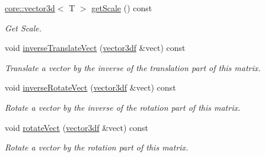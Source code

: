\begin{DoxyCompactItemize}
\mbox{\label{classirr_1_1core_1_1CMatrix4_a67d337a8fe0fe31dbd8e277be63582f6}} 
\hyperlink{classirr_1_1core_1_1vector3d}{core\+::vector3d}$<$ T $>$ \hyperlink{classirr_1_1core_1_1CMatrix4_a67d337a8fe0fe31dbd8e277be63582f6}{get\+Scale} () const
\begin{DoxyCompactList}\small\item\em Get Scale. \end{DoxyCompactList}\item 
\mbox{\label{classirr_1_1core_1_1CMatrix4_a7850ba9e85bff2b7d8e3bce517e0aba0}} 
void \hyperlink{classirr_1_1core_1_1CMatrix4_a7850ba9e85bff2b7d8e3bce517e0aba0}{inverse\+Translate\+Vect} (\hyperlink{namespaceirr_1_1core_ae6e2b2a6c552833ebbd5b7463d03586b}{vector3df} \&vect) const
\begin{DoxyCompactList}\small\item\em Translate a vector by the inverse of the translation part of this matrix. \end{DoxyCompactList}\item 
\mbox{\label{classirr_1_1core_1_1CMatrix4_aed5bc8bb8e9b58549034e2f48189d35e}} 
void \hyperlink{classirr_1_1core_1_1CMatrix4_aed5bc8bb8e9b58549034e2f48189d35e}{inverse\+Rotate\+Vect} (\hyperlink{namespaceirr_1_1core_ae6e2b2a6c552833ebbd5b7463d03586b}{vector3df} \&vect) const
\begin{DoxyCompactList}\small\item\em Rotate a vector by the inverse of the rotation part of this matrix. \end{DoxyCompactList}\item 
\mbox{\label{classirr_1_1core_1_1CMatrix4_a45e023efd5e6d0e328c63705bfb5bd06}} 
void \hyperlink{classirr_1_1core_1_1CMatrix4_a45e023efd5e6d0e328c63705bfb5bd06}{rotate\+Vect} (\hyperlink{namespaceirr_1_1core_ae6e2b2a6c552833ebbd5b7463d03586b}{vector3df} \&vect) const
\begin{DoxyCompactList}\small\item\em Rotate a vector by the rotation part of this matrix. \end{DoxyCompactList}\item 
\mbox{\label{classirr_1_1core_1_1CMatrix4_aa421db751017ae447e20ac946bb4ad92}} 

\end{DoxyCompactItemize}

